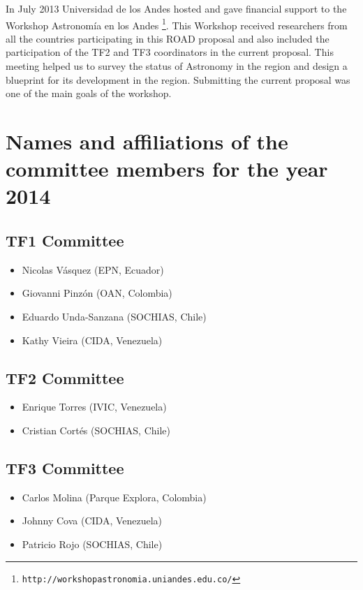 \documentclass[12pt]{article}
\begin{document}
In July 2013 Universidad de los Andes hosted and gave financial
support to the Workshop Astronomía en los
Andes \footnote{\texttt{http://workshopastronomia.uniandes.edu.co/}}. This
Workshop received researchers from all the countries participating in
this ROAD proposal and also included the participation of the TF2 and
TF3 coordinators in the current proposal. This meeting helped us to
survey the status of Astronomy in the region and design a blueprint
for its development in the region. Submitting the current proposal was
one of the main goals of the workshop. 
 

\section{Names and affiliations of the committee members for the year 2014}

\subsection*{TF1 Committee}
\begin{itemize}
\item Nicolas V\'asquez (EPN, Ecuador)
\item Giovanni Pinz\'on (OAN, Colombia)
\item Eduardo Unda-Sanzana (SOCHIAS, Chile)
\item Kathy Vieira (CIDA, Venezuela)
\end{itemize}

\subsection*{TF2 Committee}
\begin{itemize}
\item Enrique Torres  (IVIC, Venezuela)
\item Cristian Cort\'es (SOCHIAS, Chile)
\end{itemize}

\subsection*{TF3 Committee}
\begin{itemize}
\item Carlos Molina (Parque Explora, Colombia)
\item Johnny Cova (CIDA, Venezuela)
\item Patricio Rojo (SOCHIAS, Chile)
\end{itemize}
\end{document}
